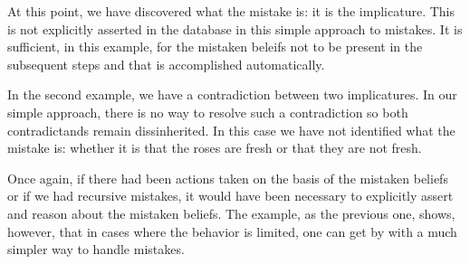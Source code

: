 \documentclass{article}
\begin{document}
At this point, we have discovered what the mistake is: it is the
implicature. This is not explicitly asserted in the database in this
simple approach to mistakes. It is sufficient, in this example, for the
mistaken beleifs not to be present in the subsequent steps and that is
accomplished automatically.

In the second example, we have a contradiction between two
implicatures. In our simple approach, there is no way to resolve such
a contradiction so both contradictands remain dissinherited. In this
case we have not identified what the mistake is: whether it is that
the roses are fresh or that they are not fresh.

Once again, if there had been actions taken on the basis of the
mistaken beliefs or if we had recursive mistakes, it would have been
necessary to explicitly assert and reason about the mistaken
beliefs. The example, as the previous one, shows, however, that in
cases where the behavior is limited, one can get by with a much
simpler way to handle mistakes.
\end{document}
